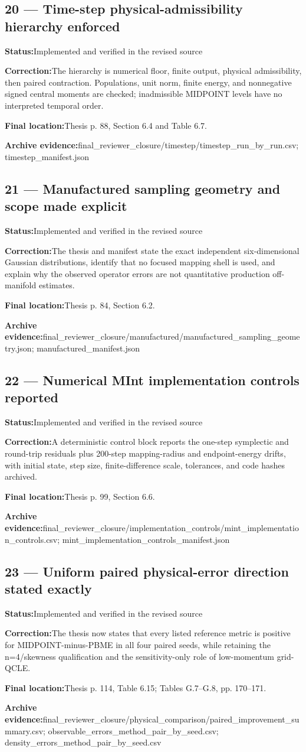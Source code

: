 \documentclass[11pt]{article}
\newcommand{\field}[2]{\textbf{#1}\quad #2\par}
\begin{document}
\subsection*{20 --- Time-step physical-admissibility hierarchy enforced}
\field{Status:}{Implemented and verified in the revised source}
\field{Correction:}{The hierarchy is numerical floor, finite output, physical admissibility, then paired contraction. Populations, unit norm, finite energy, and nonnegative signed central moments are checked; inadmissible MIDPOINT levels have no interpreted temporal order.}
\field{Final location:}{Thesis p. 88, Section 6.4 and Table 6.7.}
\field{Archive evidence:}{final\_reviewer\_closure/timestep/timestep\_run\_by\_run.csv; timestep\_manifest.json}
\subsection*{21 --- Manufactured sampling geometry and scope made explicit}
\field{Status:}{Implemented and verified in the revised source}
\field{Correction:}{The thesis and manifest state the exact independent six-dimensional Gaussian distributions, identify that no focused mapping shell is used, and explain why the observed operator errors are not quantitative production off-manifold estimates.}
\field{Final location:}{Thesis p. 84, Section 6.2.}
\field{Archive evidence:}{final\_reviewer\_closure/manufactured/manufactured\_sampling\_geometry.json; manufactured\_manifest.json}
\subsection*{22 --- Numerical MInt implementation controls reported}
\field{Status:}{Implemented and verified in the revised source}
\field{Correction:}{A deterministic control block reports the one-step symplectic and round-trip residuals plus 200-step mapping-radius and endpoint-energy drifts, with initial state, step size, finite-difference scale, tolerances, and code hashes archived.}
\field{Final location:}{Thesis p. 99, Section 6.6.}
\field{Archive evidence:}{final\_reviewer\_closure/implementation\_controls/mint\_implementation\_controls.csv; mint\_implementation\_controls\_manifest.json}
\subsection*{23 --- Uniform paired physical-error direction stated exactly}
\field{Status:}{Implemented and verified in the revised source}
\field{Correction:}{The thesis now states that every listed reference metric is positive for MIDPOINT-minus-PBME in all four paired seeds, while retaining the n=4/skewness qualification and the sensitivity-only role of low-momentum grid-QCLE.}
\field{Final location:}{Thesis p. 114, Table 6.15; Tables G.7--G.8, pp. 170--171.}
\field{Archive evidence:}{final\_reviewer\_closure/physical\_comparison/paired\_improvement\_summary.csv; observable\_errors\_method\_pair\_by\_seed.csv; density\_errors\_method\_pair\_by\_seed.csv}
\end{document}
